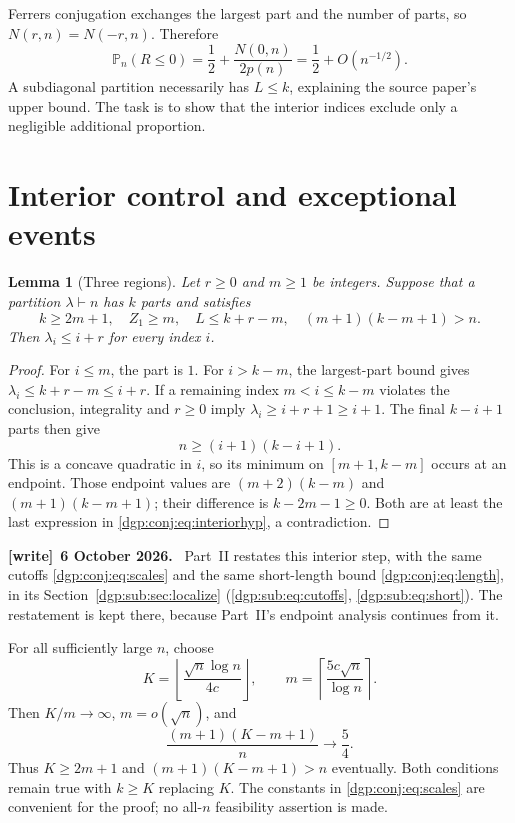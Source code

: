 \documentclass[11pt,letterpaper]{article}
\numberwithin{equation}{section}
\newtheorem{lemma}[theorem]{Lemma}
\theoremstyle{remark}\newtheorem{remark}[theorem]{Remark}
\newcommand{\PP}{\mathbb P}
\newcommand{\floor}[1]{\left\lfloor #1\right\rfloor}
\newcommand{\ceil}[1]{\left\lceil #1\right\rceil}
\newenvironment{writenote}[1][]{\par\smallskip\begingroup\small
 \noindent\textbf{[write]}\if\relax\detokenize{#1}\relax\else~\textbf{#1.}\fi\ }%
 {\par\endgroup\smallskip}
\begin{document}
Ferrers conjugation exchanges the largest part and the number of
parts, so $N(r,n)=N(-r,n)$. Therefore
\begin{equation}\label{dgp:conj:eq:rankhalf}
 \PP_n(R\leq0)=\frac12+\frac{N(0,n)}{2p(n)}
            =\frac12+O(n^{-1/2}).
\end{equation}
A subdiagonal partition necessarily has $L\leq k$, explaining the
source paper's upper bound. The task is to show that the interior
indices exclude only a negligible additional proportion.

\section{Interior control and exceptional events}\label{dgp:conj:sec:interior}
\begin{lemma}[Three regions]\label{dgp:conj:lem:interior}
Let $r\geq0$ and $m\geq1$ be integers. Suppose that a partition
$\lambda\vdash n$ has $k$ parts and satisfies
\begin{equation}\label{dgp:conj:eq:interiorhyp}
 k\geq2m+1,\quad Z_1\geq m,\quad L\leq k+r-m,
 \quad (m+1)(k-m+1)>n.
\end{equation}
Then $\lambda_i\leq i+r$ for every index $i$.
\end{lemma}
\begin{proof}
For $i\leq m$, the part is $1$. For $i>k-m$, the largest-part
bound gives $\lambda_i\leq k+r-m\leq i+r$. If a remaining index
$m<i\leq k-m$ violates the conclusion, integrality and $r\geq0$
imply $\lambda_i\geq i+r+1\geq i+1$. The final $k-i+1$ parts
then give
\[
 n\geq(i+1)(k-i+1).
\]
This is a concave quadratic in $i$, so its minimum on
$[m+1,k-m]$ occurs at an endpoint. Those endpoint values are
$(m+2)(k-m)$ and $(m+1)(k-m+1)$; their difference is
$k-2m-1\geq0$. Both are at least the last expression in
\eqref{dgp:conj:eq:interiorhyp}, a contradiction.
\end{proof}
\begin{writenote}[6 October 2026]
Part~II restates this interior step, with the same cutoffs \eqref{dgp:conj:eq:scales} and the same short-length bound \eqref{dgp:conj:eq:length}, in its Section~\ref{dgp:sub:sec:localize} (\eqref{dgp:sub:eq:cutoffs}, \eqref{dgp:sub:eq:short}). The restatement is kept there, because Part~II's endpoint analysis continues from it.
\end{writenote}

For all sufficiently large $n$, choose
\begin{equation}\label{dgp:conj:eq:scales}
 K=\floor{\frac{\sqrt n\log n}{4c}},\qquad
 m=\ceil{\frac{5c\sqrt n}{\log n}}.
\end{equation}
Then $K/m\to\infty$, $m=o(\sqrt n)$, and
\begin{equation}\label{dgp:conj:eq:areascale}
 \frac{(m+1)(K-m+1)}{n}\longrightarrow\frac54.
\end{equation}
Thus $K\geq2m+1$ and $(m+1)(K-m+1)>n$ eventually. Both
conditions remain true with $k\geq K$ replacing $K$.
The constants in \eqref{dgp:conj:eq:scales} are convenient for the proof;
no all-$n$ feasibility assertion is made.
\end{document}
